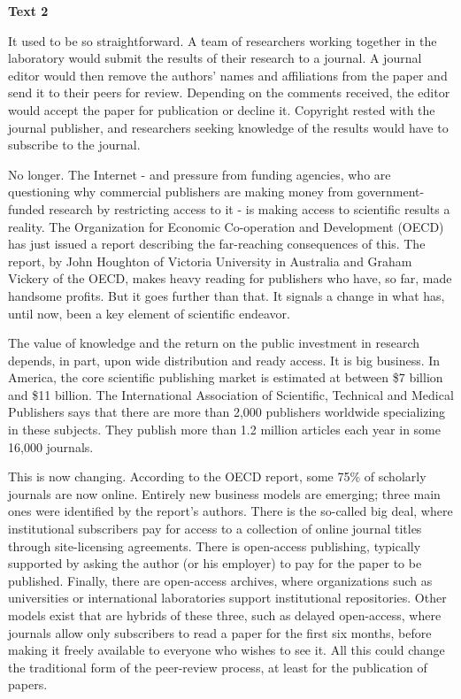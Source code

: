 
\begin{center}\textbf{Text 2}\end{center}

\qquad It used to be so straightforward. A team of researchers working together in the laboratory would submit the results of their research to a journal. A journal editor would then remove the authors' names and affiliations from the paper and send it to their peers for review. Depending on the comments received, the editor would accept the paper for publication or decline it. Copyright rested with the journal publisher, and researchers seeking knowledge of the results would have to subscribe to the journal.

\qquad No longer. The Internet - and pressure from funding agencies, who are questioning why commercial publishers are making money from government-funded research by restricting access to it - is making access to scientific results a reality. The Organization for Economic Co-operation and Development (OECD) has just issued a report describing the far-reaching consequences of this. The report, by John Houghton of Victoria University in Australia and Graham Vickery of the OECD, makes heavy reading for publishers who have, so far, made handsome profits. But it goes further than that. It signals a change in what has, until now, been a key element of scientific endeavor.

\qquad The value of knowledge and the return on the public investment in research depends, in part, upon wide distribution and ready access. It is big business. In America, the core scientific publishing market is estimated at between \$7 billion and \$11 billion. The International Association of Scientific, Technical and Medical Publishers says that there are more than 2,000 publishers worldwide specializing in these subjects. They publish more than 1.2 million articles each year in some 16,000 journals.

\qquad This is now changing. According to the OECD report, some 75\% of scholarly journals are now online. Entirely new business models are emerging; three main ones were identified by the report's authors. There is the so-called big deal, where institutional subscribers pay for access to a collection of online journal titles through site-licensing agreements. There is open-access publishing, typically supported by asking the author (or his employer) to pay for the paper to be published. Finally, there are open-access archives, where organizations such as universities or international laboratories support institutional repositories. Other models exist that are hybrids of these three, such as delayed open-access, where journals allow only subscribers to read a paper for the first six months, before making it freely available to everyone who wishes to see it. All this could change the traditional form of the peer-review process, at least for the publication of papers.

